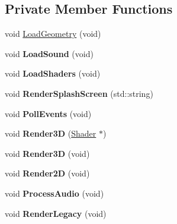 \subsection*{Private Member Functions}
\begin{DoxyCompactItemize}
\item 
void \hyperlink{class_epsilon_a78c0240886a4a651bbd68f32a8a83bcb}{Load\+Geometry} (void)
\item 
void {\bfseries Load\+Sound} (void)\hypertarget{class_epsilon_af22c2e5923fcd5eef66d82b78ebaf45b}{}\label{class_epsilon_af22c2e5923fcd5eef66d82b78ebaf45b}

\item 
void {\bfseries Load\+Shaders} (void)\hypertarget{class_epsilon_a983a024c1507b66b8ac74319416dea46}{}\label{class_epsilon_a983a024c1507b66b8ac74319416dea46}

\item 
void {\bfseries Render\+Splash\+Screen} (std\+::string)\hypertarget{class_epsilon_aec29f963fbcfdb3aea13b88716160adb}{}\label{class_epsilon_aec29f963fbcfdb3aea13b88716160adb}

\item 
void {\bfseries Poll\+Events} (void)\hypertarget{class_epsilon_a755aeb43e7f4e87b93112ad0fa16b85f}{}\label{class_epsilon_a755aeb43e7f4e87b93112ad0fa16b85f}

\item 
void {\bfseries Render3D} (\hyperlink{class_shader}{Shader} $\ast$)\hypertarget{class_epsilon_ad7d2d1703bc1dd267a7ca64f15a34feb}{}\label{class_epsilon_ad7d2d1703bc1dd267a7ca64f15a34feb}

\item 
void {\bfseries Render3D} (void)\hypertarget{class_epsilon_a64c6ffc39309ac06ba984f676f34caa5}{}\label{class_epsilon_a64c6ffc39309ac06ba984f676f34caa5}

\item 
void {\bfseries Render2D} (void)\hypertarget{class_epsilon_affd17730239b1c11b926cee6f0e394a7}{}\label{class_epsilon_affd17730239b1c11b926cee6f0e394a7}

\item 
void {\bfseries Process\+Audio} (void)\hypertarget{class_epsilon_aa6a1cc4e2d5497023b197beaa621d79d}{}\label{class_epsilon_aa6a1cc4e2d5497023b197beaa621d79d}

\item 
void {\bfseries Render\+Legacy} (void)\hypertarget{class_epsilon_af2a8325d6788484ff3e6755504189253}{}\label{class_epsilon_af2a8325d6788484ff3e6755504189253}


\end{DoxyCompactItemize}

